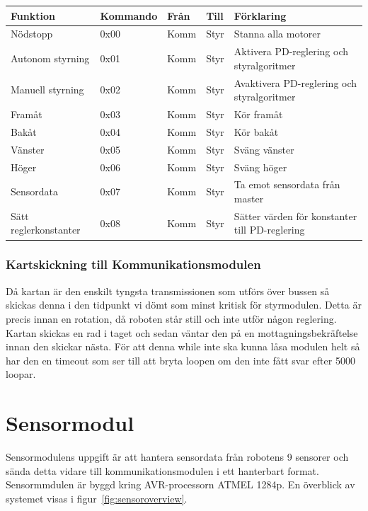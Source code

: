 \documentclass[a4paper,12pt,fleqn]{article}
\begin{document}
\begin{tabular}{| p{} | p{} | p{} | p{} | p{} |}
	\hline
	\rowcolor{listinggray}
	\textbf{Funktion} & \textbf{Kommando} & \textbf{Från} & \textbf{Till} & \textbf{Förklaring} \\ \hline
	Nödstopp & 0x00 & Komm & Styr & Stanna alla motorer \\ \hline
	Autonom styrning & 0x01 & Komm & Styr & Aktivera PD-reglering och styralgoritmer \\ \hline
	Manuell styrning & 0x02 & Komm & Styr & Avaktivera PD-reglering och styralgoritmer \\ \hline
	Framåt & 0x03 & Komm & Styr & Kör framåt \\ \hline
	Bakåt & 0x04 & Komm & Styr & Kör bakåt \\ \hline
	Vänster & 0x05 & Komm & Styr & Sväng vänster \\ \hline
	Höger & 0x06 & Komm & Styr & Sväng höger \\ \hline
	Sensordata & 0x07 & Komm & Styr & Ta emot sensordata från master \\ \hline
	Sätt reglerkonstanter & 0x08 & Komm & Styr & Sätter värden för konstanter till PD-reglering \\ \hline
\end{tabular}

\subsubsection{Kartskickning till Kommunikationsmodulen}
Då kartan är den enskilt tyngsta transmissionen som utförs över bussen så skickas denna i den tidpunkt vi dömt som minst kritisk för styrmodulen. Detta är precis innan en rotation, då roboten står still och inte utför någon reglering. 
Kartan skickas en rad i taget och sedan väntar den på en mottagningsbekräftelse innan den skickar nästa. För att denna while inte ska kunna låsa modulen helt så har den en timeout som ser till att bryta loopen om den inte fått svar efter 5000 loopar.

\newpage



\section{Sensormodul}
Sensormodulens uppgift är att hantera sensordata från robotens 9 sensorer och sända detta vidare till kommunikationsmodulen i ett hanterbart format. Sensormmdulen är byggd kring AVR-processorn ATMEL 1284p. En överblick av systemet visas i figur~\ref{fig:sensoroverview}.
\end{document}
